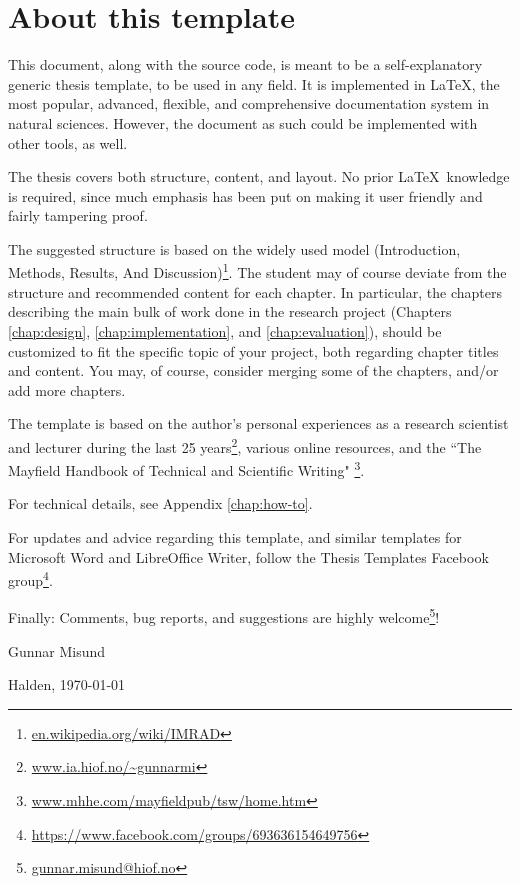 \chapter*{About this template}
\label{chap:about}


This document, along with the source code, is meant to be a self-explanatory generic thesis template, to be used in any field. It is implemented in \LaTeX, the most popular, advanced, flexible, and comprehensive documentation system in natural sciences. However, the document as such could be implemented with other tools, as well.

The thesis covers both structure, content, and layout. No prior \LaTeX\ knowledge is required, since much emphasis has been put on making it user friendly and fairly tampering proof.

The suggested structure is based on the widely used  model (Introduction, Methods, Results, And Discussion)\footnote{\url{en.wikipedia.org/wiki/IMRAD}}. The student may of course deviate from the structure and recommended content for each chapter. In particular, the chapters describing the main bulk of work done in the research project (Chapters \ref{chap:design}, \ref{chap:implementation}, and \ref{chap:evaluation}), should be customized to fit the specific topic of your project, both regarding chapter titles and content. You may, of course, consider merging some of the chapters, and/or add more chapters.

The template is based on the author's personal experiences as a research scientist and lecturer during the last 25 years\footnote{\url{www.ia.hiof.no/~gunnarmi}}, various online resources, 
and the ``The Mayfield Handbook of Technical and Scientific Writing"  \parencite{perelman97mht}\footnote{\url{www.mhhe.com/mayfieldpub/tsw/home.htm}}.

For technical details, see Appendix \ref{chap:how-to}.

For updates and advice regarding this template, and similar templates for Microsoft Word and LibreOffice Writer, follow the Thesis Templates Facebook group\footnote{\url{https://www.facebook.com/groups/693636154649756}}.

Finally: Comments, bug reports, and suggestions are highly welcome\footnote{\url{gunnar.misund@hiof.no}}!

\vspace{20mm}

Gunnar Misund

Halden, \today





